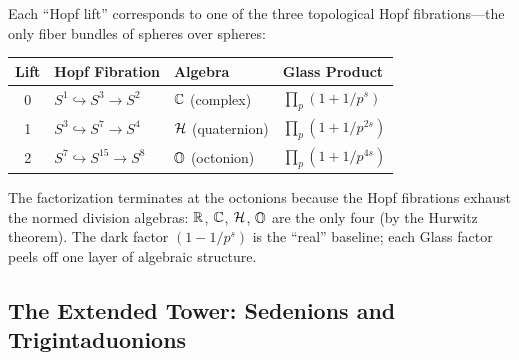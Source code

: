 \begin{correspondence}
\label{corr:hopf}
Each ``Hopf lift'' corresponds to one of the three topological Hopf
fibrations---the only fiber bundles of spheres over spheres:
\begin{center}
\begin{tabular}{@{}clll@{}}
\toprule
\textbf{Lift} & \textbf{Hopf Fibration} & \textbf{Algebra} & \textbf{Glass Product} \\
\midrule
0 & $S^1 \hookrightarrow S^3 \to S^2$ & $\mathbb{C}$ (complex) & $\prod_p(1 + 1/p^s)$ \\
1 & $S^3 \hookrightarrow S^7 \to S^4$ & $\mathcal{H}$ (quaternion) & $\prod_p(1 + 1/p^{2s})$ \\
2 & $S^7 \hookrightarrow S^{15} \to S^8$ & $\mathbb{O}$ (octonion) & $\prod_p(1 + 1/p^{4s})$ \\
\bottomrule
\end{tabular}
\end{center}
The factorization terminates at the octonions because the Hopf
fibrations exhaust the normed division algebras: $\mathbb{R}$, $\mathbb{C}$, $\mathcal{H}$,
$\mathbb{O}$ are the only four (by the Hurwitz theorem). The dark factor
$(1 - 1/p^s)$ is the ``real'' baseline; each Glass factor
peels off one layer of algebraic structure.
\end{correspondence}

\subsection{The Extended Tower: Sedenions and Trigintaduonions}


